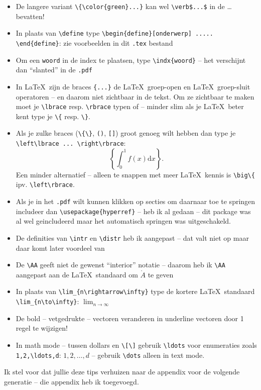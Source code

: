 \documentclass[a4paper]{exam}
\theoremstyle{definition}
\newtheorem*{define}{Definitie}
\DeclareMathOperator{\intr}{\mathop{int}}
\newcommand{\indx}[1]{\index{#1}{\sl #1}}%
\begin{document}
\begin{itemize}
		\item De langere variant \verb$\{\color{green}...}$ kan wel \verb#\verb$...$# in de \dots bevatten!
		\item In plaats van \verb$\define$ type \verb$\begin{define}[onderwerp] ..... \end{define}$: zie voorbeelden in dit \verb$.tex$ bestand
		\item Om een \verb$woord$ in de index te plaatsen, type \verb$\indx{woord}$ -- het verschijnt dan ``slanted'' in de \verb$.pdf$
		\item In \LaTeX\ zijn de braces \verb${...}$ de \LaTeX\ groep-open en \LaTeX\ groep-sluit operatoren -- en daarom niet zichtbaar in de tekst. Om ze zichtbaar te maken moet je \verb$\lbrace$ resp.{} \verb$\rbrace$ typen of -- minder slim als je \LaTeX\ beter kent type je \verb$\{$ resp.{} \verb$\}$.
		\item Als je zulke braces (\verb$\{\}$, \verb$()$, \verb$[]$) groot genoeg wilt hebben dan type je \verb$\left\lbrace ... \right\rbrace$:
		\[
		\left\lbrace \int_0^1 f(x) \text{d}x \right\rbrace.
		\]
		Een minder alternatief -- alleen te snappen met meer \LaTeX\ kennis is \verb$\big\{$ ipv.{} \verb$\left\rbrace$.
		\item Als je in het \verb$.pdf$ wilt kunnen klikken op secties om daarnaar toe te springen includeer dan
		\verb$\usepackage{hyperref}$ -- heb ik al gedaan -- dit package was al wel geincludeerd maar het automatisch springen was uitgeschakeld.
		\item De definities van \verb$\intr$ en \verb$\distr$ heb ik aangepast -- dat valt niet op maar daar komt later voordeel van
		\item De \verb$\AA$ geeft niet de gewenst ``interior'' notatie -- daarom heb ik \verb$\AA$ aangepast aan de \LaTeX\ standaard
		om $\mathring{A}$ te geven
		\item In plaats van \verb$\lim_{n\rightarrow\infty}$ type de kortere \LaTeX\ standaard \verb$\lim_{n\to\infty}$: $\lim_{n\to\infty}$
		\item De bold -- vetgedrukte -- vectoren veranderen in underline vectoren door 1 regel te wijzigen!
		\item In math mode -- tussen dollars en \verb$\[\]$ gebruik \verb$\ldots$ voor enumeraties zoals \verb$1,2,\ldots,d$: $1,2,\ldots,d$ -- gebruik \verb$\dots$ alleen in text mode.
	\end{itemize}
	Ik stel voor dat jullie deze tips verhuizen naar de appendix voor de volgende generatie -- die appendix heb ik toegevoegd.
	
\end{document}
